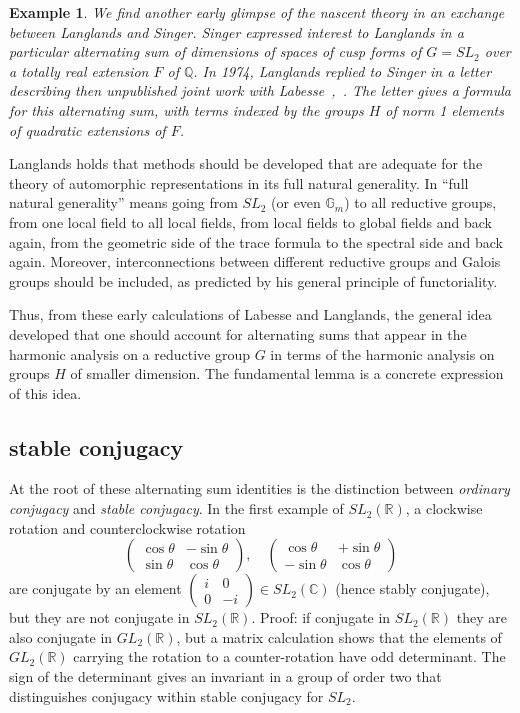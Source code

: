\documentclass[brochure,english,12pt]{bourbaki}
\newtheorem{example}[equation]{Example}
\newcommand{\ring}[1]{\mathbb{#1}}
\begin{document}
\begin{example}
We find another early glimpse of the nascent theory in an exchange between Langlands and Singer.  Singer
expressed interest to Langlands in a particular alternating sum of
dimensions of spaces of cusp forms of $G=SL_2$ over a totally real
extension $F$ of $\ring{Q}$.  In 1974, Langlands replied to Singer in
a letter describing then unpublished joint work with
Labesse~\cite{Singer},~\cite{LL}.  The letter gives a formula for
this alternating sum, with terms indexed by the groups $H$ of norm 1
elements of quadratic extensions of $F$.  
\end{example}

Langlands holds that  methods should be developed that are adequate for the
theory of automorphic representations in its full natural generality.
In ``full natural generality'' means going from $SL_2$ (or even
$\ring{G}_m$) to all reductive groups, from one local field to all
local fields, from local fields to global fields and back again, from
the geometric side of the trace formula to the spectral side and back
again.  Moreover,  interconnections between different reductive
groups and Galois groups should be included, as predicted by his
general principle of functoriality.

Thus, from these early calculations of Labesse and Langlands, the
general idea developed that one should account for alternating sums
that appear in the harmonic analysis on a reductive group $G$ in terms
of the harmonic analysis on groups $H$ of smaller dimension. 
The fundamental lemma is a concrete expression of this idea. 


\subsection{stable conjugacy}

At the root of these alternating sum identities is the distinction between
{\it ordinary conjugacy} and {\it stable conjugacy}.  In the first example of $SL_2(\ring{R})$,
a clockwise rotation and counterclockwise rotation
\[
\begin{pmatrix}\cos\theta &-\sin\theta\\\sin\theta &\cos\theta\end{pmatrix},\quad
\begin{pmatrix}\cos\theta &+\sin\theta\\-\sin\theta &\cos\theta\end{pmatrix}
\]
are conjugate by an element $\begin{pmatrix}i&0\\0&-i\end{pmatrix}\in
SL_2(\ring{C})$ (hence stably conjugate), but they are not conjugate
in $SL_2(\ring{R})$.  Proof: if conjugate in $SL_2(\ring{R})$ they are
also conjugate in $GL_2(\ring{R})$, but a matrix calculation shows
that the elements of $GL_2(\ring{R})$ carrying the rotation to a
counter-rotation have odd determinant.  The sign of the determinant
gives an invariant in a group of order two that distinguishes
conjugacy within stable conjugacy for $SL_2$.
\end{document}
